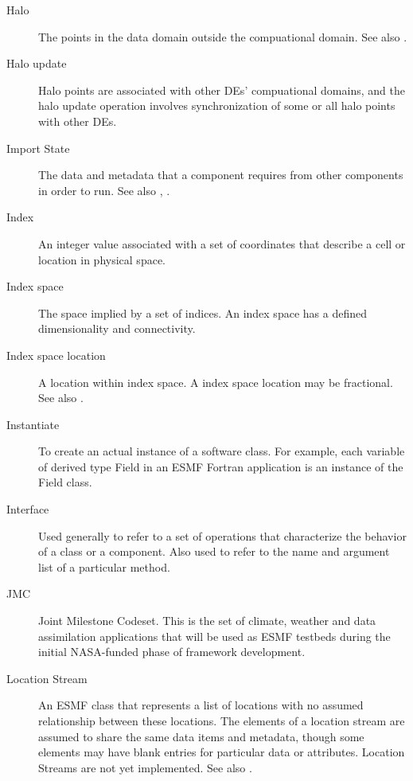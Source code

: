 \begin{description}
\item[Halo] \label{glos:Halo} 
  The points in the data domain outside the compuational domain. 
  See also . 

\item[Halo update] \label{glos:HaloUpdate}
  Halo points are associated with other DEs'
  compuational domains, and the halo update operation involves
  synchronization of some or all halo points with other DEs. 

\item[Import State] \label{glos:ImportState} The data and metadata 
  that a component requires from other components in order to run.  
  See also , .

\item[Index] \label{glos:Index} An integer value associated with a set
  of coordinates that describe a cell or location in physical space.

\item[Index space] \label{glos:IndexSpace} The space implied 
  by a set of indices.  An index space has a defined dimensionality and 
  connectivity.

\item[Index space location] \label{glos:IndexSpaceloc} 
  A location within index space.  A index space location may be fractional.
  See also .

\item[Instantiate] \label{glos:Instantiate}
  To create an actual instance of a software class.  For example, each 
  variable of derived type Field in an ESMF Fortran application is an 
  instance of the Field class.

\item[Interface] \label{glos:Interface}
  Used generally to refer to a set of operations that characterize 
  the behavior of a class or a component.  Also used to refer to the
  name and argument list of a particular method.

\item[JMC] \label{glos:JMC} 
  Joint Milestone Codeset.  This is the set of climate, weather and
  data assimilation applications that will be used as ESMF testbeds 
  during the initial NASA-funded phase of framework development.

\item[Location Stream] \label{glos:LocStream} An ESMF class that represents
  a list of locations with no assumed relationship between these locations.  The
  elements of a location stream are assumed to share the same data
  items and metadata, though some elements may have blank entries for
  particular data or attributes. Location Streams are not yet implemented.
  See also .


\end{description}
